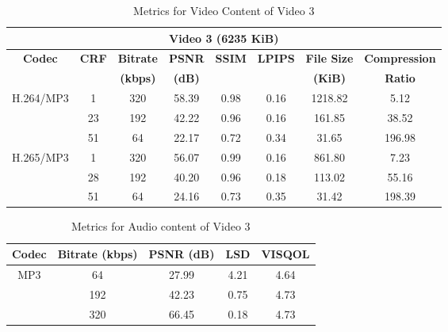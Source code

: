 \documentclass{ioereport}
\begin{document}
    \begin{table}[H]
        \centering
        \caption{Metrics for Video Content of Video 3}
        \label{table:vid-met-3}
        \begin{tabular}{|c|c|c|c|c|c|c|c|}
        \hline
        \multicolumn{8}{|c|}{\textbf{Video 3 (6235 KiB)}} \\ \hline
        \multirow{2}{*}{\textbf{Codec}} & \multirow{2}{*}{\textbf{CRF}} & \textbf{Bitrate} & \textbf{PSNR} & \textbf{SSIM} & \textbf{LPIPS} & \textbf{File Size} & \textbf{Compression} \\ 
        &  & \textbf{(kbps)} & \textbf{(dB)} &  &  & \textbf{(KiB)} & \textbf{Ratio} \\ \hline
        \multirow{3}{*}{H.264/MP3} & 1  & 320 & 58.39 & 0.98 & 0.16 & 1218.82 & 5.12 \\ \cline{2-8} 
                                   & 23 & 192 & 42.22 & 0.96 & 0.16 & 161.85  & 38.52 \\ \cline{2-8} 
                                   & 51 & 64  & 22.17 & 0.72 & 0.34 & 31.65   & 196.98 \\ \hline
        \multirow{3}{*}{H.265/MP3} & 1  & 320 & 56.07 & 0.99 & 0.16 & 861.80  & 7.23 \\ \cline{2-8} 
                                   & 28 & 192 & 40.20 & 0.96 & 0.18 & 113.02  & 55.16 \\ \cline{2-8} 
                                   & 51 & 64  & 24.16 & 0.73 & 0.35 & 31.42   & 198.39 \\ \hline
        \end{tabular}
    \end{table}
    


    \begin{table}[H]
        \centering
        \caption{Metrics for Audio content of Video 3}
        \label{table:aud-met-3}
        \begin{tabular}{|c|c|c|c|c|}
        \hline
        \textbf{Codec} & \textbf{Bitrate (kbps)} & \textbf{PSNR (dB)} & \textbf{LSD} & \textbf{VISQOL} \\ \hline
        \multirow{3}{*}{MP3} & 64  & 27.99 & 4.21 & 4.64 \\ \cline{2-5} 
                                   & 192 & 42.23 & 0.75 & 4.73 \\ \cline{2-5} 
                                   & 320 & 66.45 & 0.18 & 4.73 \\ \hline
        \end{tabular}
    \end{table}
    
\end{document}
